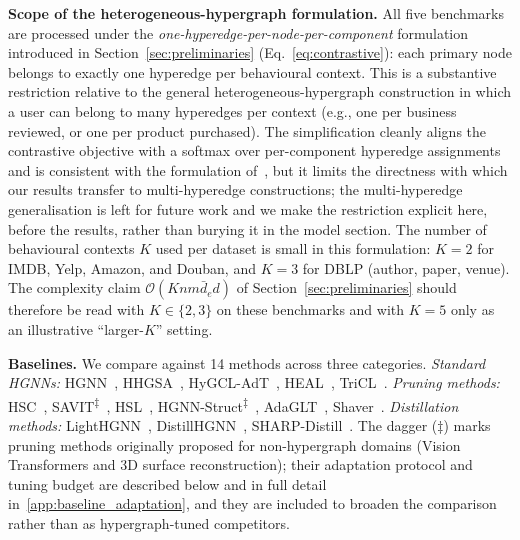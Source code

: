 \documentclass[10pt]{article}
\theoremstyle{plain}
\theoremstyle{definition}
\begin{document}
\textbf{Scope of the heterogeneous-hypergraph formulation.} All five benchmarks are processed under the \emph{one-hyperedge-per-node-per-component} formulation introduced in Section~\ref{sec:preliminaries} (Eq.~\eqref{eq:contrastive}): each primary node belongs to exactly one hyperedge per behavioural context. This is a substantive restriction relative to the general heterogeneous-hypergraph construction in which a user can belong to many hyperedges per context (e.g., one per business reviewed, or one per product purchased). The simplification cleanly aligns the contrastive objective with a softmax over per-component hyperedge assignments and is consistent with the formulation of~\citet{kim2024survey}, but it limits the directness with which our results transfer to multi-hyperedge constructions; the multi-hyperedge generalisation is left for future work and we make the restriction explicit here, before the results, rather than burying it in the model section. The number of behavioural contexts $K$ used per dataset is small in this formulation: $K\!=\!2$ for IMDB, Yelp, Amazon, and Douban, and $K\!=\!3$ for DBLP (author, paper, venue). The complexity claim $\mathcal{O}(Knm\bar{d}_e d)$ of Section~\ref{sec:preliminaries} should therefore be read with $K\!\in\!\{2,3\}$ on these benchmarks and with $K\!=\!5$ only as an illustrative ``larger-$K$'' setting.

\textbf{Baselines.} We compare against 14 methods across three categories. \emph{Standard HGNNs:} HGNN~\citep{feng2019hypergraph}, HHGSA~\citep{khan2025heterogeneous}, HyGCL-AdT~\citep{qian2024dual}, HEAL~\citep{ju2024hypergraph}, TriCL~\citep{lee2023m}. \emph{Pruning methods:} HSC~\citep{lin2024filter}, SAVIT\textsuperscript{$\ddagger$}~\citep{zheng2022savit}, HSL~\citep{cai2022hypergraph}, HGNN-Struct\textsuperscript{$\ddagger$}~\citep{jiang2023structure}, AdaGLT~\citep{zhang2024graph}, Shaver~\citep{tran2025device}. \emph{Distillation methods:} LightHGNN~\citep{feng2024lighthgnn}, DistillHGNN~\citep{forouzandeh2025distillhgnn}, SHARP-Distill~\citep{forouzandeh2025SHARP}. The dagger ($\ddagger$) marks pruning methods originally proposed for non-hypergraph domains (Vision Transformers and 3D surface reconstruction); their adaptation protocol and tuning budget are described below and in full detail in~\ref{app:baseline_adaptation}, and they are included to broaden the comparison rather than as hypergraph-tuned competitors.
\end{document}
